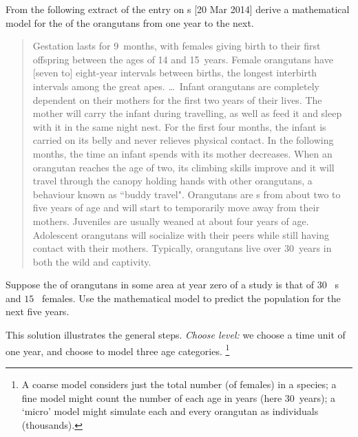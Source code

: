 \begin{example}[orangutans] \label{eg:orang}
From the following  extract of the  entry on s [20 Mar 2014] derive a mathematical model for the  of the orangutans from one year to the next.
\begin{quote}
Gestation lasts for 9~months, with females giving birth to their first offspring between the ages of 14 and 15~years. Female orangutans have [seven to] eight-year intervals between births, the longest interbirth intervals among the great apes. \ldots\  Infant orangutans are completely dependent on their mothers for the first two years of their lives. The mother will carry the infant during travelling, as well as feed it and sleep with it in the same night nest. For the first four months, the infant is carried on its belly and never relieves physical contact. In the following months, the time an infant spends with its mother decreases. When an orangutan reaches the age of two, its climbing skills improve and it will travel through the canopy holding hands with other orangutans, a behaviour known as ``buddy travel". Orangutans are s from about two to five years of age and will start to temporarily move away from their mothers.  Juveniles are usually weaned at about four years of age. Adolescent orangutans will socialize with their peers while still having contact with their mothers. Typically, orangutans live over 30~years in both the wild and captivity.
\end{quote}
Suppose the  of orangutans in some area at year zero of a study is that of \(30\)~ s and \(15\)~ females.
Use the mathematical model to predict the population for the next five years.

\begin{solution} This solution illustrates the general steps.
\emph{Choose level:}  we choose a time unit of one year, and choose to model three age categories.%
\footnote{A coarse model considers just the total number (of females) in a species; a fine model might count the number of each age in years (here 30~years); a `micro' model might simulate each and every orangutan as individuals (thousands).}


\end{solution}
\end{example}
